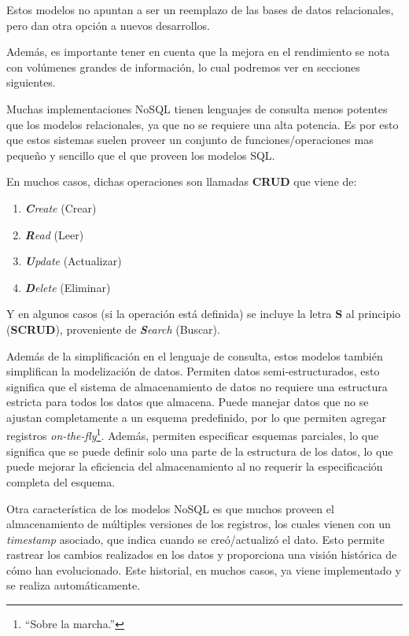 \documentclass[pdflatex,sn-mathphys-num]{sn-jnl}
\theoremstyle{thmstyleone}%
\theoremstyle{thmstyletwo}%
\theoremstyle{thmstylethree}%
\begin{document}
Estos modelos no apuntan a ser un reemplazo de las bases de datos relacionales, pero dan otra opción a nuevos desarrollos.

Además, es importante tener en cuenta que la mejora en el rendimiento se nota con volúmenes grandes de información, lo cual podremos ver en secciones siguientes.

Muchas implementaciones NoSQL tienen lenguajes de consulta menos potentes que los modelos relacionales, ya que no se requiere una alta potencia. Es por esto que estos sistemas suelen proveer un conjunto de funciones/operaciones mas pequeño y sencillo que el que proveen los modelos SQL. 

En muchos casos, dichas operaciones son llamadas \textbf{CRUD} que viene de:

\begin{enumerate}
    \item \textit{\textbf{C}reate} (Crear)
    \item \textit{\textbf{R}ead} (Leer)
    \item \textit{\textbf{U}pdate} (Actualizar)
    \item \textit{\textbf{D}elete} (Eliminar)
\end{enumerate}

Y en algunos casos (si la operación está definida) se incluye la letra \textbf{S} al principio (\textbf{SCRUD}), proveniente de \textit{\textbf{S}earch} (Buscar).

Además de la simplificación en el lenguaje de consulta, estos modelos también simplifican la modelización de datos. Permiten datos semi-estructurados, esto significa que el sistema de almacenamiento de datos no requiere una estructura estricta para todos los datos que almacena. Puede manejar datos que no se ajustan completamente a un esquema predefinido, por lo que permiten agregar registros \textit{on-the-fly}\footnote{``Sobre la marcha.''}. Además, permiten especificar esquemas parciales, lo que significa que se puede definir solo una parte de la estructura de los datos, lo que puede mejorar la eficiencia del almacenamiento al no requerir la especificación completa del esquema.

Otra característica de los modelos NoSQL es que muchos proveen el almacenamiento de múltiples versiones de los registros, los cuales vienen con un \textit{timestamp} asociado, que indica cuando se creó/actualizó el dato. Esto permite rastrear los cambios realizados en los datos y proporciona una visión histórica de cómo han evolucionado. Este historial, en muchos casos, ya viene implementado y se realiza automáticamente.
\end{document}
